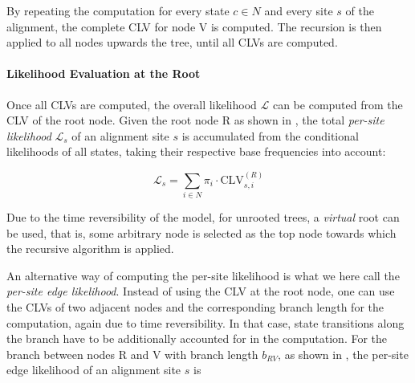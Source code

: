 By repeating the computation for every state $c \in N$ and every site $s$ of the alignment,
the complete CLV for node {\sffamily V} is computed.
The recursion is then applied to all nodes upwards the tree, until all CLVs are computed.

\paragraph{Likelihood Evaluation at the Root}
\label{ch:Foundations:sec:MLTreeInference:sub:LikelihoodComputations:par:RootLikelihood}

Once all CLVs are computed, the overall likelihood $\mathcal{L}$ can be computed from the CLV of the root node.
Given the root node {\sffamily R} as shown in ,
the total \emph{per-site likelihood} $\mathcal{L}_s$ of an alignment site $s$ is
accumulated from the conditional likelihoods of all states, taking their respective base frequencies into account:

\begin{equation}
    \label{ch:Foundations:sec:MLTreeInference:eq:root_site_likelihood}
    \mathcal{L}_{s} = \sum_{i \in N} \pi_i \cdot \mbox{CLV}^{(R)}_{s,i}
\end{equation}

Due to the time reversibility of the model, for unrooted trees, a \emph{virtual} root can be used, that is,
some arbitrary node is selected as the top node towards which the recursive algorithm is applied.


An alternative way of computing the per-site likelihood is what we here call the \emph{per-site edge likelihood}.
Instead of using the CLV at the root node,
one can use the CLVs of two adjacent nodes and the corresponding branch length for the computation,
again due to time reversibility.
In that case, state transitions along the branch have to be additionally accounted for in the computation.
For the branch between nodes {\sffamily R} and {\sffamily V} with branch length $b_{RV}$,
as shown in , the per-site edge likelihood of an alignment site $s$ is

